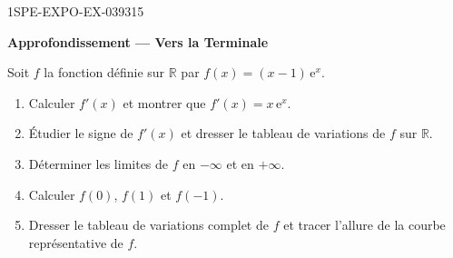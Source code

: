 \begin{exercice}{1SPE-EXPO-EX-039}{3}{15}
\begin{center}\textbf{Approfondissement — Vers la Terminale}\end{center}
Soit $f$ la fonction définie sur $\mathbb{R}$ par $f(x) = (x-1)\,\mathrm{e}^{x}$.

\begin{enumerate}
\item Calculer $f'(x)$ et montrer que $f'(x) = x\,\mathrm{e}^{x}$.
\item Étudier le signe de $f'(x)$ et dresser le tableau de variations de $f$ sur $\mathbb{R}$.
\item Déterminer les limites de $f$ en $-\infty$ et en $+\infty$.
\item Calculer $f(0)$, $f(1)$ et $f(-1)$.
\item Dresser le tableau de variations complet de $f$ et tracer l'allure de la courbe représentative de $f$.
\end{enumerate}
\end{exercice}

